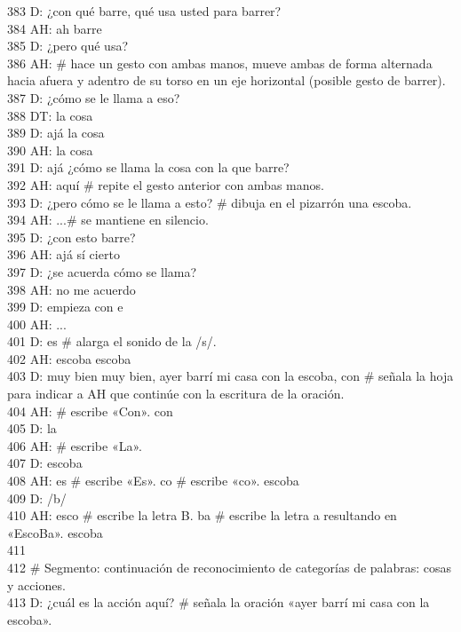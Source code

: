 383 D: ¿con qué barre, qué usa usted para barrer?\\
384 AH: ah barre\\
385 D: ¿pero qué usa?\\
386 AH: \# hace un gesto con ambas manos, mueve ambas de forma alternada hacia afuera y adentro de su torso en un eje horizontal (posible gesto de barrer).\\
387 D: ¿cómo se le llama a eso?\\
388 DT: la cosa\\
389 D: ajá la cosa\\
390 AH: la cosa\\
391 D: ajá ¿cómo se llama la cosa con la que barre?\\
392 AH: aquí \# repite el gesto anterior con ambas manos.\\
393 D: ¿pero cómo se le llama a esto? \# dibuja en el pizarrón una escoba.\\
394 AH: ...\# se mantiene en silencio.\\
395 D: ¿con esto barre?\\
396 AH: ajá sí cierto\\
397 D: ¿se acuerda cómo se llama?\\
398 AH: no me acuerdo\\
399 D: empieza con e\\
400 AH: ...\\
401 D: es \# alarga el sonido de la /s/.\\
402 AH: escoba escoba\\
403 D: muy bien muy bien, ayer barrí mi casa con la escoba, con \# señala la hoja para indicar a AH que continúe con la escritura de la oración.\\
404 AH: \# escribe «Con». con\\
405 D: la\\
406 AH: \# escribe «La».\\
407 D: escoba\\
408 AH: es \# escribe «Es». co \# escribe «co». escoba\\
409 D: /b/\\
410 AH: esco \# escribe la letra B. ba \# escribe la letra a resultando en «EscoBa». escoba\\
411 \\
412 \# Segmento: continuación de reconocimiento de categorías de palabras: cosas y acciones.\\
413 D: ¿cuál es la acción aquí? \# señala la oración «ayer barrí mi casa con la escoba».\\
